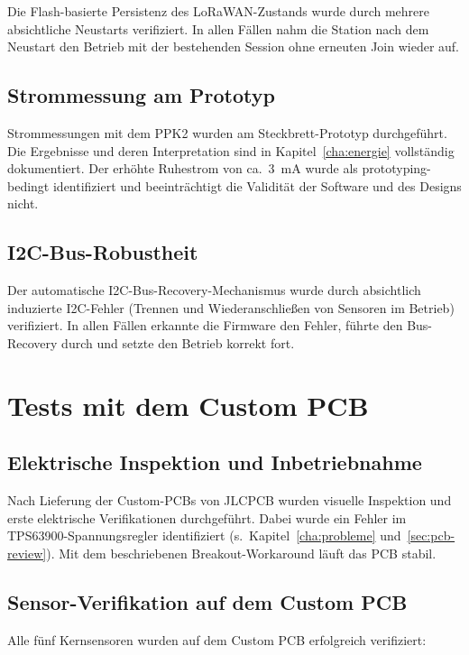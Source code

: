 Die Flash-basierte Persistenz des LoRaWAN-Zustands wurde durch mehrere absichtliche Neustarts verifiziert. In allen Fällen nahm die Station nach dem Neustart den Betrieb mit der bestehenden Session ohne erneuten Join wieder auf.

\subsection*{Strommessung am Prototyp}

Strommessungen mit dem PPK2 wurden am Steckbrett-Prototyp durchgeführt. Die Ergebnisse und deren Interpretation sind in Kapitel~\ref{cha:energie} vollständig dokumentiert. Der erhöhte Ruhestrom von ca.\ 3~mA wurde als prototyping-bedingt identifiziert und beeinträchtigt die Validität der Software und des Designs nicht.

\subsection*{I2C-Bus-Robustheit}

Der automatische I2C-Bus-Recovery-Mechanismus wurde durch absichtlich induzierte I2C-Fehler (Trennen und Wiederanschließen von Sensoren im Betrieb) verifiziert. In allen Fällen erkannte die Firmware den Fehler, führte den Bus-Recovery durch und setzte den Betrieb korrekt fort.

\newpage

\section*{Tests mit dem Custom PCB}
\label{sec:testing-pcb}

\subsection*{Elektrische Inspektion und Inbetriebnahme}

Nach Lieferung der Custom-PCBs von JLCPCB wurden visuelle Inspektion und erste elektrische Verifikationen durchgeführt. Dabei wurde ein Fehler im TPS63900-Spannungsregler identifiziert (s.\ Kapitel~\ref{cha:probleme} und~\ref{sec:pcb-review}). Mit dem beschriebenen Breakout-Workaround läuft das PCB stabil.

\subsection*{Sensor-Verifikation auf dem Custom PCB}

Alle fünf Kernsensoren wurden auf dem Custom PCB erfolgreich verifiziert:

